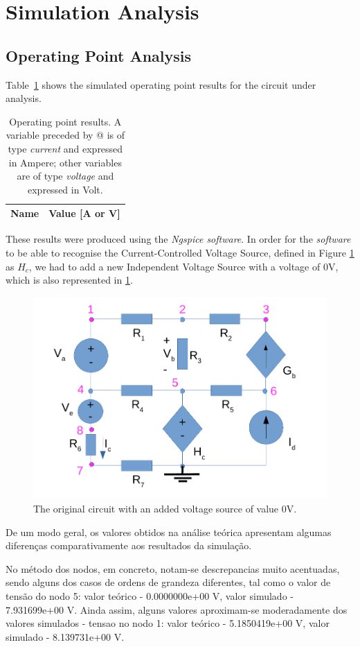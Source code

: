 \section{Simulation Analysis}
\label{sec:simulation}

\subsection{Operating Point Analysis}

Table~\ref{tab:op} shows the simulated operating point results for the circuit under analysis.

\begin{table}[htb!]
  \centering
  \begin{tabular}{|l|r|}
    \hline    
    {\bf Name} & {\bf Value [A or V]} \\ \hline
    
  \end{tabular}
  \caption{Operating point results. A variable preceded by @ is of type {\em current}
    and expressed in Ampere; other variables are of type {\it voltage} and expressed in
    Volt.}
  \label{tab:op}
\end{table}

These results were produced using the \textit{Ngspice software}. In order for the \textit{software} to be able to recognise the Current-Controlled Voltage Source, defined in Figure \ref{fig2} as $H_c$, we had to add a new Independent Voltage Source with a voltage of 0V, which is also represented in \ref{fig2}.


\begin{figure}[h] \centering
\includegraphics[width=0.4\linewidth]{t1-2.pdf}
\caption{The original circuit with an added voltage source of value 0V.}
\label{fig2}
\end{figure}

De um modo geral, os valores obtidos na análise teórica apresentam algumas diferenças comparativamente aos resultados da simulação.

No método dos nodos, em concreto, notam-se descrepancias muito acentuadas, sendo alguns dos casos de ordens de grandeza diferentes, tal como o valor de tensão do nodo 5: valor teórico - 0.0000000e+00 V, valor simulado - 7.931699e+00 V. Ainda assim, alguns valores aproximam-se moderadamente dos valores simulados - tensao no nodo 1: valor teórico -  5.1850419e+00 V, valor simulado - 8.139731e+00 V.



